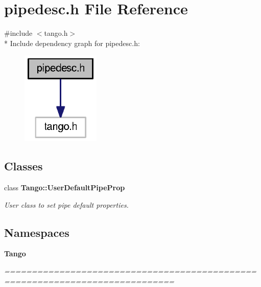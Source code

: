 \section{pipedesc.\-h File Reference}
\label{pipedesc_8h}
{\ttfamily \#include $<$tango.\-h$>$}\\*
Include dependency graph for pipedesc.\-h\-:
\nopagebreak
\begin{figure}[H]
\begin{center}
\leavevmode
\includegraphics[width=106pt]{d6/dc1/pipedesc_8h__incl}
\end{center}
\end{figure}
\subsection*{Classes}
\begin{DoxyCompactItemize}
\item 
class {\bf Tango\-::\-User\-Default\-Pipe\-Prop}
\begin{DoxyCompactList}\small\item\em User class to set pipe default properties. \end{DoxyCompactList}\end{DoxyCompactItemize}
\subsection*{Namespaces}
\begin{DoxyCompactItemize}
\item 
{\bf Tango}
\begin{DoxyCompactList}\small\item\em ============================================================================= \end{DoxyCompactList}\end{DoxyCompactItemize}
